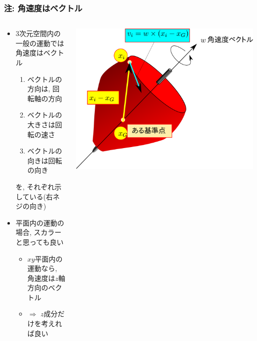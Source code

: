 \documentclass[10pt,dvipdfmx]{beamer}
\begin{document}
\begin{frame}
\frametitle{注: 角速度はベクトル}
\begin{columns}
\begin{column}{0.6\textwidth}
\begin{itemize}
\item 3次元空間内の一般の運動では角速度はベクトル
  \begin{enumerate}
  \item ベクトルの方向は, 回転軸の方向
  \item ベクトルの大きさは回転の速さ
  \item ベクトルの向きは回転の向き
  \end{enumerate}
を, それぞれ示している(右ネジの向き)

\item 平面内の運動の場合, スカラーと思っても良い
  \begin{itemize}
  \item $xy$平面内の運動なら, 角速度は$z$軸方向のベクトル
  \item $\Rightarrow$ $z$成分だけを考えれば良い
  \end{itemize}
\end{itemize}
\end{column}

\begin{column}{0.4\textwidth}
  \includegraphics[width=\textwidth]{out/pdf/svg/v_w_r.pdf}
\end{column}
  
\end{columns}
\end{frame}
\end{document}
